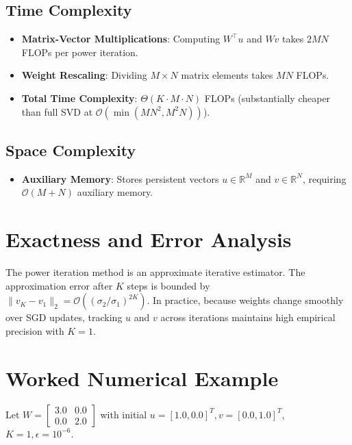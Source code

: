 \documentclass[11pt,a4paper]{article}
\theoremstyle{definition}
\begin{document}
\subsection{Time Complexity}
\begin{itemize}
    \item \textbf{Matrix-Vector Multiplications}: Computing $W^\top u$ and $W v$ takes $2 M N$ FLOPs per power iteration.
    \item \textbf{Weight Rescaling}: Dividing $M \times N$ matrix elements takes $M N$ FLOPs.
    \item \textbf{Total Time Complexity}: $\Theta(K \cdot M \cdot N)$ FLOPs (substantially cheaper than full SVD at $\mathcal{O}(\min(M N^2, M^2 N))$).
\end{itemize}

\subsection{Space Complexity}
\begin{itemize}
    \item \textbf{Auxiliary Memory}: Stores persistent vectors $u \in \mathbb{R}^M$ and $v \in \mathbb{R}^N$, requiring $\mathcal{O}(M + N)$ auxiliary memory.
\end{itemize}

\section{Exactness and Error Analysis}

The power iteration method is an approximate iterative estimator. The approximation error after $K$ steps is bounded by $\|v_K - v_1\|_2 = \mathcal{O}((\sigma_2 / \sigma_1)^{2K})$. In practice, because weights change smoothly over SGD updates, tracking $u$ and $v$ across iterations maintains high empirical precision with $K = 1$.

\section{Worked Numerical Example}

Let $W = \begin{bmatrix} 3.0 & 0.0 \\ 0.0 & 2.0 \end{bmatrix}$ with initial $u = [1.0, 0.0]^T, v = [0.0, 1.0]^T$, $K = 1, \epsilon = 10^{-6}$.
\end{document}
